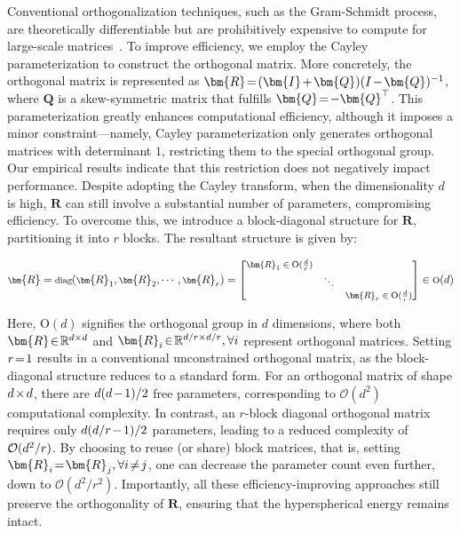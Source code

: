 {Conventional orthogonalization techniques, such as the Gram-Schmidt process, are theoretically differentiable but are prohibitively expensive to compute for large-scale matrices~\cite{liu2021orthogonal}. To improve efficiency, we employ the Cayley parameterization to construct the orthogonal matrix. More concretely, the orthogonal matrix is represented as $\thickmuskip=2mu \medmuskip=2mu \bm{R}=(\bm{I}+\bm{Q})(I-\bm{Q})^{-1}$, where $\bm{Q}$ is a skew-symmetric matrix that fulfills $\thickmuskip=2mu \medmuskip=2mu \bm{Q}=-\bm{Q}^\top$. This parameterization greatly enhances computational efficiency, although it imposes a minor constraint—namely, Cayley parameterization only generates orthogonal matrices with determinant $1$, restricting them to the special orthogonal group. Our empirical results indicate that this restriction does not negatively impact performance. Despite adopting the Cayley transform, when the dimensionality $d$ is high, $\bm{R}$ can still involve a substantial number of parameters, compromising efficiency. To overcome this, we introduce a block-diagonal structure for $\bm{R}$, partitioning it into $r$ blocks. The resultant structure is given by:

\begin{equation}
    \footnotesize
    \bm{R}=\text{diag}(\bm{R}_1,\bm{R}_2,\cdots,\bm{R}_r)=\begin{bmatrix}
    \bm{R}_1\in \text{O}(\frac{d}{r}) &  &\\
    &\ddots & \\
    & & \bm{R}_r\in \text{O}(\frac{d}{r})
    \end{bmatrix}\in \text{O}(d)
\end{equation}

Here, $\text{O}(d)$ signifies the orthogonal group in $d$ dimensions, where both $\thickmuskip=2mu \medmuskip=2mu \bm{R}\in\mathbb{R}^{d\times d}$ and $\thickmuskip=2mu \medmuskip=2mu \bm{R}_i\in\mathbb{R}^{d/r\times d/r},\forall i$ represent orthogonal matrices. Setting $\thickmuskip=2mu \medmuskip=2mu r=1$ results in a conventional unconstrained orthogonal matrix, as the block-diagonal structure reduces to a standard form. For an orthogonal matrix of shape $\thickmuskip=2mu \medmuskip=2mu d\times d$, there are $\thickmuskip=2mu \medmuskip=2mu d(d-1)/2$ free parameters, corresponding to $\mathcal{O}(d^2)$ computational complexity. In contrast, an $r$-block diagonal orthogonal matrix requires only $\thickmuskip=2mu \medmuskip=2mu d(d/r-1)/2$ parameters, leading to a reduced complexity of $\thickmuskip=2mu \medmuskip=2mu \mathcal{O}(d^2/r)$. By choosing to reuse (or share) block matrices, that is, setting $\thickmuskip=2mu \medmuskip=2mu\bm{R}_i=\bm{R}_j,\forall i\neq j$, one can decrease the parameter count even further, down to $\mathcal{O}(d^2/r^2)$. Importantly, all these efficiency-improving approaches still preserve the orthogonality of $\bm{R}$, ensuring that the hyperspherical energy remains intact.

}
